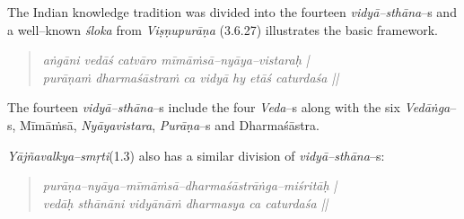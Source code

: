 The Indian knowledge tradition was divided into the fourteen \textit{vidyā–sthāna}–s and a well–known \textit{śloka} from \textit{Viṣṇupurāṇa} (3.6.27) illustrates the basic framework.

\vspace{-.3cm}

\begin{verse}
\textit{aṅgāni vedāś catvāro mīmāṁsā–nyāya–vistaraḥ | }\\\textit{purāṇaṁ dharmaśāstraṁ ca vidyā hy etāś caturdaśa ||}
\end{verse}

\vspace{-.3cm}

The fourteen \textit{vidyā–sthāna}–s include the four \textit{Veda}–s along with the six \textit{Vedāṅga}–s, Mīmāṁsā, \textit{Nyāyavistara}, \textit{Purāṇa}–s and Dharmaśāstra.


\textit{Yājñavalkya–smṛti}(1.3) also has a similar division of \textit{vidyā–sthāna}–s:


\vspace{-.3cm}

\begin{verse}
\textit{purāṇa–nyāya–mīmāṁsā–dharmaśāstrāṅga–miśritāḥ |}\\\textit{vedāḥ sthānāni vidyānāṁ dharmasya ca caturdaśa ||}
\end{verse}

\vspace{-.3cm}

